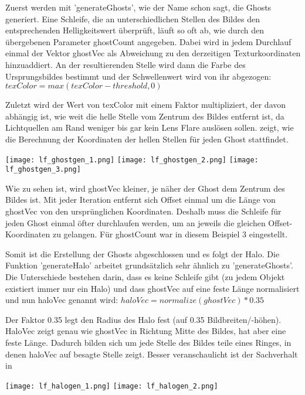 Zuerst werden mit 'generateGhosts', wie der Name schon sagt, die Ghosts generiert. Eine Schleife, die an unterschiedlichen Stellen des Bildes den entsprechenden Helligkeitswert überprüft, läuft so oft ab, wie durch den übergebenen Parameter ghostCount angegeben. Dabei wird in jedem Durchlauf einmal der Vektor ghostVec als Abweichung zu den derzeitigen Texturkoordinaten hinzuaddiert. An der resultierenden Stelle wird dann die Farbe des Ursprungsbildes bestimmt und der Schwellenwert wird von ihr abgezogen: $texColor = max(texColor - threshold, 0)$

Zuletzt wird der Wert von texColor mit einem Faktor multipliziert, der davon abhängig ist, wie weit die helle Stelle vom Zentrum des Bildes entfernt ist, da Lichtquellen am Rand weniger bis gar kein Lens Flare auslösen sollen.  zeigt, wie die Berechnung der Koordinaten der hellen Stellen für jeden Ghost stattfindet.

\captionsetup{type=figure}
\texttt{[image: lf\_ghostgen\_1.png]}
\texttt{[image: lf\_ghostgen\_2.png]}
\texttt{[image: lf\_ghostgen\_3.png]}
\label{img:lfghostgen}

Wie zu sehen ist, wird ghostVec kleiner, je näher der Ghost dem Zentrum des Bildes ist. Mit jeder Iteration entfernt sich Offset einmal um die Länge von ghostVec von den ursprünglichen Koordinaten. Deshalb muss die Schleife für jeden Ghost einmal öfter durchlaufen werden, um an jeweils die gleichen Offset-Koordinaten zu gelangen. Für ghostCount war in diesem Beispiel 3 eingestellt.

Somit ist die Erstellung der Ghosts abgeschlossen und es folgt der Halo. Die Funktion 'generateHalo' arbeitet grundsätzlich sehr ähnlich zu 'generateGhosts'. Die Unterschiede bestehen darin, dass es keine Schleife gibt (zu jedem Objekt existiert immer nur ein Halo) und dass ghostVec auf eine feste Länge normalisiert und nun haloVec genannt wird: $haloVec = normalize(ghostVec) * 0.35$

Der Faktor 0.35 legt den Radius des Halo fest (auf 0.35 Bildbreiten/-höhen). HaloVec zeigt genau wie ghostVec in Richtung Mitte des Bildes, hat aber eine feste Länge. Dadurch bilden sich um jede Stelle des Bildes teile eines Ringes, in denen haloVec auf besagte Stelle zeigt. Besser veranschaulicht ist der Sachverhalt in 

\captionsetup{type=figure}
\texttt{[image: lf\_halogen\_1.png]}
\texttt{[image: lf\_halogen\_2.png]}
\label{img:lfhalogen}

